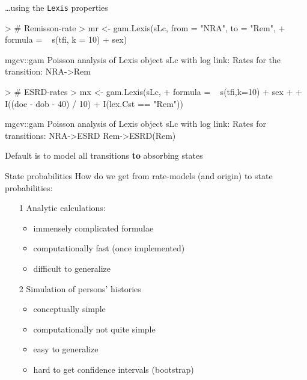 \begin{frame}[fragile]{\ldots using the \texttt{Lexis} properties}
\vspace*{-1em}
\begin{Schunk}
\begin{Sinput}
> # Remisson-rate
> mr <- gam.Lexis(sLc, from = "NRA", to = "Rem",
+                 formula = ~ s(tfi, k = 10) + sex)
\end{Sinput}
\begin{Soutput}
mgcv::gam Poisson analysis of Lexis object sLc with log link:
Rates for the transition:
NRA->Rem
\end{Soutput}
\begin{Sinput}
> # ESRD-rates
> mx <- gam.Lexis(sLc,
+                 formula = ~ s(tfi,k=10) + sex +
+                             I((doe - dob - 40) / 10) + I(lex.Cst == "Rem"))
\end{Sinput}
\begin{Soutput}
mgcv::gam Poisson analysis of Lexis object sLc with log link:
Rates for transitions:
NRA->ESRD
Rem->ESRD(Rem)
\end{Soutput}
\end{Schunk}
\vspace*{-1em}
Default is to model all transitions \textbf{to} absorbing states
\end{frame}

\begin{frame}{State probabilities}
   How do we get from rate-models (and origin) to state probabilities:
\pause
   \begin{itemize}[<+->]
   \item[1] Analytic calculations:

 \begin{itemize}[<+->]
     \item immensely complicated formulae
     \item computationally fast (once implemented)
     \item difficult to generalize
     \end{itemize}

   \item[2] Simulation of persons' histories

     \begin{itemize}[<+->]
     \item conceptually simple
     \item computationally not quite simple
     \item easy to generalize
     \item hard to get confidence intervals (bootstrap)
     \end{itemize}

   \end{itemize}
\end{frame}

